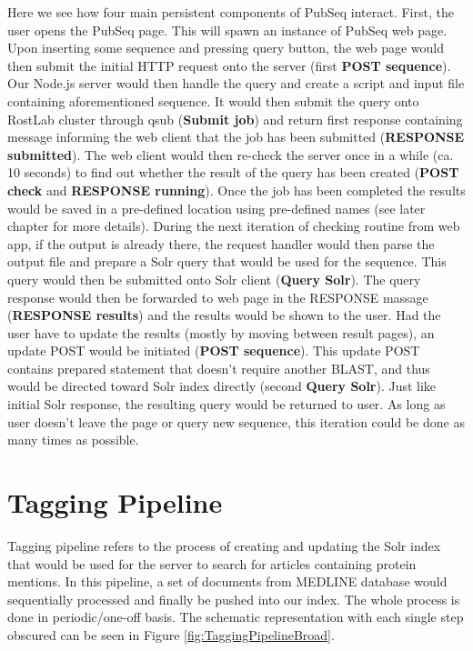 Here we see how four main persistent components of PubSeq interact. First, the user opens the PubSeq page. This will spawn an instance of PubSeq web page. Upon inserting some sequence and pressing query button, the web page would then submit the initial HTTP request \citep{fielding1999hypertext} onto the server (first \textbf{POST sequence}). Our Node.js server \citep{tilkov2010node} would then handle the query and create a script and input file containing aforementioned sequence. It would then submit the query onto RostLab cluster through qsub (\textbf{Submit job}) \citep{gentzsch2001sun} and return first response containing message informing the web client that the job has been submitted (\textbf{RESPONSE submitted}). The web client would then re-check the server once in a while (ca. 10 seconds) to find out whether the result of the query has been created (\textbf{POST check} and \textbf{RESPONSE running}). Once the job has been completed the results would be saved in a pre-defined location using pre-defined names (see later chapter for more details). During the next iteration of checking routine from web app, if the output is already there, the request handler would then parse the output file and prepare a Solr query that would be used for the sequence. This query would then be submitted onto Solr client (\textbf{Query Solr}). The query response would then be forwarded to web page in the RESPONSE massage (\textbf{RESPONSE results}) and the results would be shown to the user. Had the user have to update the results (mostly by moving between result pages), an update POST would be initiated (\textbf{POST sequence}). This update POST contains prepared statement that doesn't require another BLAST, and thus would be directed toward Solr index directly (second \textbf{Query Solr}). Just like initial Solr response, the resulting query would be returned to user. As long as user doesn't leave the page or query new sequence, this iteration could be done as many times as possible.


\section{Tagging Pipeline}

Tagging pipeline refers to the process of creating and updating the Solr index that would be used for the server to search for articles containing protein mentions. In this pipeline, a set of documents from MEDLINE database would sequentially processed and finally be pushed into our index. The whole process is done in periodic/one-off basis. The schematic representation with each single step obscured can be seen in Figure \ref{fig:TaggingPipelineBroad}.

